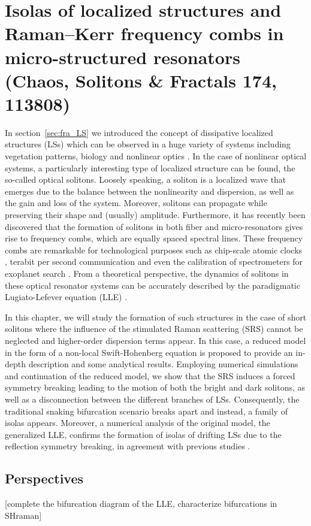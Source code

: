 \chapter{Isolas of localized structures and Raman–Kerr frequency combs in micro-structured resonators (Chaos, Solitons \& Fractals 174, 113808)}

In section~\ref{sec:fra_LS} we introduced the concept of dissipative 
localized structures (LSs) which can be observed in a huge variety
of systems including vegetation patterns, biology and 
nonlinear optics \cite{tlidi2014localized,heimburg2005soliton}. In the case of nonlinear optical systems,
a particularly interesting type of localized structure can be found,
the so-called optical solitons. Loosely speaking, a soliton
is a localized wave that emerges due to the balance between the nonlinearity
and dispersion, as well as the gain and loss of the system. Moreover,
solitons can propagate while preserving their shape and (usually) amplitude.
Furthermore, it has recently been discovered that the formation of solitons
in both fiber and micro-resonators gives rise to frequency combs, which are equally
spaced spectral lines. These frequency combs are remarkable
for technological purposes such as chip-scale atomic clocks \cite{Jost2015clock}, terabit
per second communication \cite{marin2017microresonator} and even the calibration of spectrometers
for exoplanet search \cite{suh2019searching}. From a theoretical perspective, the dynamics
of solitons in these optical resonator systems can be accurately described 
by the paradigmatic Lugiato-Lefever equation (LLE) \cite{lugiatolefever1987}.

In this chapter, we will study the formation of such structures in the
case of short solitons where the influence of the stimulated Raman scattering (SRS)
cannot be neglected and higher-order dispersion terms appear. In this case, a reduced model
in the form of a non-local Swift-Hohenberg equation is proposed to provide an
in-depth description and some analytical results. Employing numerical simulations and
continuation of the reduced model, we show that the SRS induces a forced symmetry
breaking leading to the motion of both the bright and dark solitons, as well as a disconnection between 
the different branches of LSs. Consequently, the traditional snaking bifurcation scenario breaks
apart and instead, a family of isolas appears. Moreover, a numerical analysis of the
original model, the generalized LLE, confirms the formation of isolas of drifting LSs due
to the reflection symmetry breaking, in agreement with previous studies \cite{burke2009swift,parra2014third}.



\section{Perspectives}

[complete the bifurcation diagram of the LLE, characterize bifurcations in SHraman]